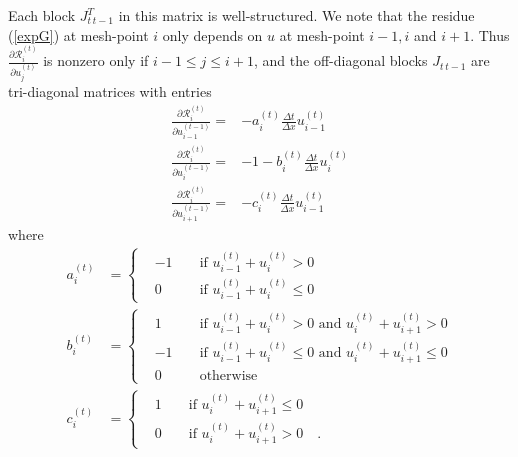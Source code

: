     Each block $J_{t\,t-1}^T$ in this matrix is well-structured.  We note
    that the residue (\ref{expG}) at mesh-point $i$ only depends on $u$ at
    mesh-point $i-1,i$ and $i+1$.  Thus
    $\frac{\partial \mathcal{R}_i^{(t)}}{\partial u_j^{(t)}}$
    is nonzero only if $i-1\le j\le i+1$,
    and the off-diagonal blocks $J_{t\, t-1}$ are tri-diagonal matrices
    with entries
    \begin{equation} \label{burgerR} \begin{split}
       \frac{\partial \mathcal{R}_i^{(t)}}{\partial u_{i-1}^{(t-1)}}
       =& - a_i^{(t)} \frac{\Delta t}{\Delta x} u_{i-1}^{(t)} \\
       \frac{\partial \mathcal{R}_i^{(t)}}{\partial u_{i  }^{(t-1)}}
       =& - 1 - b_i^{(t)} \frac{\Delta t}{\Delta x} u_{i}^{(t)} \\
       \frac{\partial \mathcal{R}_i^{(t)}}{\partial u_{i+1}^{(t-1)}}
       =& - c_i^{(t)} \frac{\Delta t}{\Delta x} u_{i-1}^{(t)}
    \end{split} \end{equation}
    where
    \[ \begin{split}
       a_i^{(t)} &= \left\{ \begin{aligned}
                        & -1 && \mbox{ if } u_{i-1}^{(t)} + u_i^{(t)} > 0 \\
                        & 0 && \mbox{ if } u_{i-1}^{(t)} + u_i^{(t)} \le 0
                    \end{aligned} \right. \\
       b_i^{(t)} &= \left\{ \begin{aligned}
                        & 1 && \mbox{ if } u_{i-1}^{(t)} + u_i^{(t)} > 0
                            \mbox{ and } u_i^{(t)} + u_{i+1}^{(t)} > 0 \\
                        & -1 && \mbox{ if } u_{i-1}^{(t)} + u_i^{(t)} \le 0
                            \mbox{ and } u_i^{(t)} + u_{i+1}^{(t)} \le 0 \\
                        & 0 && \mbox{ otherwise }
                    \end{aligned} \right. \\
       c_i^{(t)} &= \left\{ \begin{aligned}
                        & 1 && \mbox{ if } u_i^{(t)} + u_{i+1}^{(t)} \le 0 \\
                        & 0 && \mbox{ if } u_i^{(t)} + u_{i+1}^{(t)} > 0
                            \quad .
                    \end{aligned} \right.
    \end{split} \]
    
